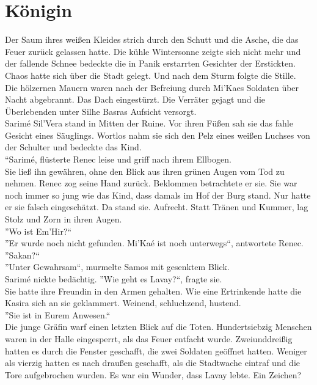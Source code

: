 \chapter{Königin}

Der Saum ihres weißen Kleides strich durch den Schutt und die Asche, die das Feuer zurück gelassen 
hatte. Die kühle Wintersonne zeigte sich nicht mehr und der fallende Schnee bedeckte die in Panik 
erstarrten Gesichter der Erstickten. Chaos hatte sich über die Stadt gelegt. Und nach dem Sturm 
folgte die Stille.\\
Die hölzernen Mauern waren nach der Befreiung durch Mi'Kaes Soldaten über Nacht abgebrannt. Das 
Dach eingestürzt. Die Verräter gejagt und die Überlebenden unter Silhe Basras Aufsicht versorgt.\\
Sarimé Sil'Vera stand in Mitten der Ruine. Vor ihren Füßen sah sie das fahle Gesicht eines 
Säuglings. Wortlos nahm sie sich den Pelz eines weißen Luchses von der Schulter und bedeckte das 
Kind.\\
``Sarimé, flüsterte Renec leise und griff nach ihrem Ellbogen.\\
Sie ließ ihn gewähren, ohne den Blick aus ihren grünen Augen vom Tod zu nehmen. Renec zog seine 
Hand zurück. Beklommen betrachtete er sie. Sie war noch immer so jung wie das Kind, dass damals im 
Hof der Burg stand. Nur hatte er sie falsch eingeschätzt. Da stand sie. Aufrecht. Statt Tränen und 
Kummer, lag Stolz und Zorn in ihren Augen.\\
''Wo ist Em'Hir?``\\
''Er wurde noch nicht gefunden. Mi'Kaé ist noch unterwegs``, antwortete Renec.\\
''Sakan?``\\
''Unter Gewahrsam``, murmelte Samos mit gesenktem Blick.\\
Sarimé nickte bedächtig. ''Wie geht es Lavay?``, fragte sie.\\
Sie hatte ihre Freundin in den Armen gehalten. Wie eine Ertrinkende hatte die Kasira sich an sie 
geklammert. Weinend, schluchzend, hustend.\\
''Sie ist in Eurem Anwesen.``\\
Die junge Gräfin warf einen letzten Blick auf die Toten. Hundertsiebzig Menschen waren in der Halle 
eingesperrt, als das Feuer entfacht wurde. Zweiunddreißig hatten es durch die Fenster geschafft, die 
zwei Soldaten geöffnet hatten. Weniger als vierzig hatten es nach draußen geschafft, als die 
Stadtwache eintraf und die Tore aufgebrochen wurden. Es war ein Wunder, dass Lavay lebte. Ein 
Zeichen?\\


